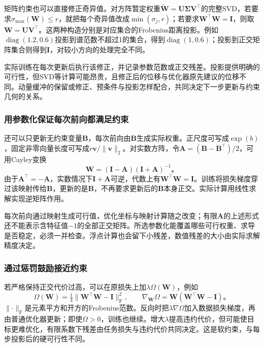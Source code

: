 矩阵约束也可以直接修正奇异值。对方阵暂定权重$\tilde{\bm W}=\bm U\bm\Sigma\bm V^{\top}$的完整SVD，若要求$\sigma_{\max}(\bm W)\leq r$，就把每个奇异值改成$\min(\sigma_j,r)$；若要求$\bm W^{\top}\bm W=\bm I$，则取$\bm W=\bm U\bm V^{\top}$。这两种构造分别是对应集合的Frobenius距离投影。例如$\operatorname{diag}(1.2,0.6)$投影到谱范数不超过1的集合，得到$\operatorname{diag}(1,0.6)$；投影到正交矩阵集合则得到$\bm I$，对较小方向的处理完全不同。

实际训练在每次更新后执行该修正，并记录参数范数或正交残差。投影提供明确的可行性，但SVD等计算可能昂贵，且修正后的位移与优化器原先建议的位移不同。动量缓冲的保留或修正、预条件与投影怎样配合，共同决定下一步更新与约束几何的关系。

\subsubsection{用参数化保证每次前向都满足约束}

还可以只更新无约束变量$\bm B$，每次前向由$\bm B$生成实际权重。正尺度可写成$\exp(b)$，固定非零向量长度可写成$r\bm v/\lVert\bm v\rVert_2$。对实数方阵，令$\bm A=(\bm B-\bm B^{\top})/2$，可用Cayley变换
\begin{equation}
  \bm W=(\bm I-\bm A)(\bm I+\bm A)^{-1}\text{。}
  \label{eq:training-cayley-parameterization}
\end{equation}
由于$\bm A^{\top}=-\bm A$，实数情况下$\bm I+\bm A$可逆，代数上有$\bm W^{\top}\bm W=\bm I$。训练将损失梯度穿过该映射传给$\bm B$，更新的是$\bm B$，不再要求更新后的$\bm B$本身正交。实际计算用线性求解实现逆矩阵作用。

每次前向通过映射生成可行值，优化坐标与映射计算随之改变；有限$\bm A$的上述形式还不能表示含特征值$-1$的全部正交矩阵。所选参数化能覆盖哪些可行权重、求导是否稳定，必须一并检查。浮点计算也会留下小残差，数值残差的大小由实际求解精度决定。

\subsubsection{通过惩罚鼓励接近约束}

若严格保持正交代价过高，可以在原损失上加$\lambda\Omega(\bm W)$，例如
\begin{equation}
  \Omega(\bm W)=\tfrac14\lVert\bm W^{\top}\bm W-\bm I\rVert_{\mathrm F}^2,
  \qquad\nabla_{\bm W}\Omega=\bm W(\bm W^{\top}\bm W-\bm I)\text{。}
  \label{eq:training-orthogonality-penalty}
\end{equation}
$\lVert\cdot\rVert_{\mathrm F}$是元素平方和开方的Frobenius范数。反向时把$\lambda\nabla\Omega$加入数据损失梯度，再由普通优化器更新；即使$\Omega>0$，训练也继续。增大$\lambda$提高违约代价，但可能使目标更难优化，有限系数下残差由任务损失与违约代价共同决定。这是软约束，与每步投影后的硬可行性不同。

